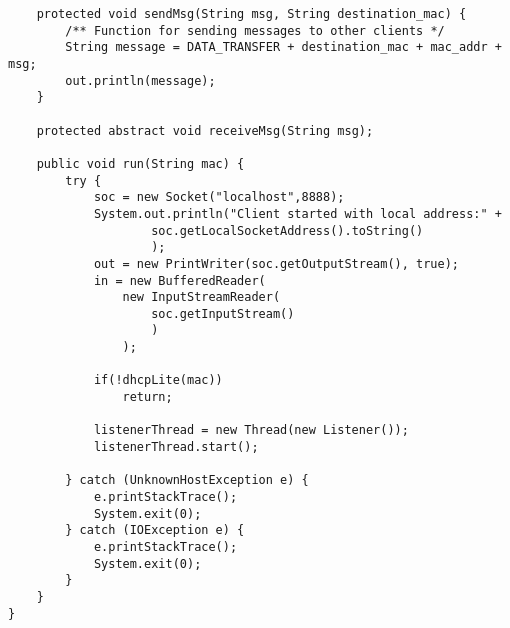 \begin{verbatim}
	protected void sendMsg(String msg, String destination_mac) {
		/** Function for sending messages to other clients */
		String message = DATA_TRANSFER + destination_mac + mac_addr + msg;
		out.println(message);
	}

	protected abstract void receiveMsg(String msg);

	public void run(String mac) {
		try {
			soc = new Socket("localhost",8888);
			System.out.println("Client started with local address:" +
					soc.getLocalSocketAddress().toString()
					);
			out = new PrintWriter(soc.getOutputStream(), true);
			in = new BufferedReader(
				new InputStreamReader(
					soc.getInputStream()
					)
				);

			if(!dhcpLite(mac))
				return;	
			
			listenerThread = new Thread(new Listener());
			listenerThread.start();

		} catch (UnknownHostException e) {
			e.printStackTrace();
			System.exit(0);
		} catch (IOException e) {
			e.printStackTrace();
			System.exit(0);
		}
	}
}
\end{verbatim}
